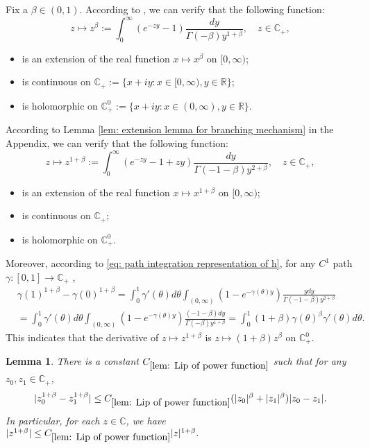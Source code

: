 \documentclass[12pt,oneside,english]{amsart}
\theoremstyle{plain}
\newtheorem{lem}[thm]{Lemma}
\theoremstyle{definition}
\numberwithin{equation}{section}
\begin{document}
    Fix a $\beta \in (0,1)$.
    According to \cite[Theorem 3.2. \& Theorem 3.5.]{SchillingSongVondracek2010Bernstein}, we can verify that the following function:
\begin{equation}
    z
    \mapsto z^{\beta}
    := \int_0^\infty (e^{-zy}-1) \frac{dy}{\Gamma(-\beta)y^{1+\beta}},
    \quad z\in \mathbb C_+,
\end{equation}
\begin{itemize}
\item
    is an extension of the real function $x\mapsto x^{\beta}$ on $[0,\infty)$;
\item
    is continuous on $\mathbb C_+ :=\{x+iy: x\in [0,\infty), y\in \mathbb R\}$;
\item
    is holomorphic on $\mathbb C_+^0:= \{x+iy:x\in (0,\infty), y\in \mathbb R\}$.
\end{itemize}
    According to Lemma \ref{lem: extension lemma for branching mechanism} in the Appendix, we can verify that the following function:
\begin{equation}
\label{eq: stable branching on C+}
    z\mapsto
    z^{1+\beta}
    := \int_0^\infty (e^{-zy}-1+zy)\frac{dy}{\Gamma(-1-\beta)y^{2+\beta}},
    \quad z\in \mathbb C_+,
\end{equation}
\begin{itemize}
\item
    is an extension of the real function $x\mapsto x^{1+\beta}$ on $[0,\infty)$;
\item
    is continuous on $\mathbb C_+$;
\item
    is holomorphic on $\mathbb C_+^0$.
\end{itemize}
    Moreover, according to \eqref{eq: path integration representation of h}, for any $C^1$ path $\gamma:[0,1]\to \mathbb C_+$ ,
\begin{align}
\label{eq: integration formula for 1+beta-th power of z}
    &\gamma(1)^{1+\beta} - \gamma(0)^{1+\beta}
    = \int_0^1 \gamma'(\theta)d\theta \int_{(0,\infty)}(1-e^{-\gamma(\theta)y})\frac{ydy}{\Gamma(-1-\beta)y^{2+\beta}}
    \\&=\int_0^1 \gamma'(\theta)d\theta \int_{(0,\infty)}(1-e^{-\gamma(\theta)y})\frac{(-1-\beta)dy}{\Gamma(-\beta)y^{1+\beta}}
    = \int_0^1 (1+\beta) \gamma(\theta)^{\beta} \gamma'(\theta)d\theta.
\end{align}
    This indicates that the derivative of $z\mapsto z^{1+\beta}$ is $z\mapsto (1+\beta)z^{\beta}$ on $\mathbb C^0_+$.
\begin{lem}
\label{lem: Lip of power function}
    There is a constant $C_{\ref{lem: Lip of power function}}$ such that for any $z_0,z_1 \in \mathbb C_+$,
\begin{equation}
\label{eq: Lip of power function}
    |z_0^{1+\beta} - z_1^{1+\beta}|
    \leq C_{\ref{lem: Lip of power function}}(|z_0|^{\beta}+|z_1|^{\beta})|z_0 - z_1|.
\end{equation}
    In particular, for each $z\in \mathbb C$, we have
$
    |z^{1+\beta}|
    \leq  C_{\ref{lem: Lip of power function}} |z|^{1+\beta}.
$

\end{lem}
\end{document}
